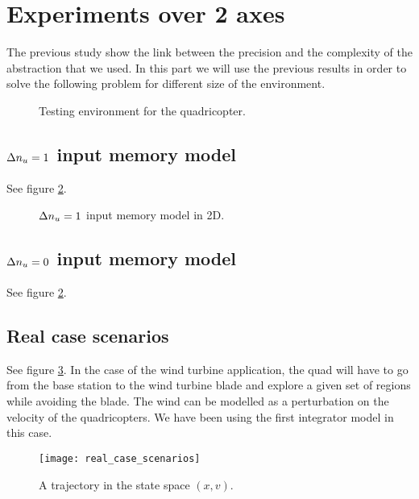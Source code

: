 \section{Experiments over 2 axes}



The previous study show the link between the precision and the complexity of the abstraction that we used.
In this part we will use the previous results in order to solve the following problem for different size of the environment.
\begin{figure}
	\center
	
	\caption{Testing environment for the quadricopter.}
	\label{fig:environment}
\end{figure}


\subsection{$\Delta n_u = 1$ input memory model}
See figure \ref{fig:double_reduce_2D}.

\begin{figure*}
	\center
	
	\caption{$\Delta n_u=1$ input memory model in 2D.}
	\label{fig:double_reduce_2D}
\end{figure*}

\subsection{$\Delta n_u = 0$ input memory model}
See figure \ref{fig:double_reduce_2D}.


\subsection{Real case scenarios}
See figure \ref{fig:real_case}.
In the case of the wind turbine application, the quad will have to go from the base station to the wind turbine blade and explore a given set of regions while avoiding the blade.
The wind can be modelled as a perturbation on the velocity of the quadricopters.
We have been using the first integrator model in this case.

\begin{figure}[!ht]
  \centering
  \texttt{[image: real\_case\_scenarios]}
  \caption{A trajectory in the state space $(x,v)$.}
  \label{fig:real_case}
\end{figure}

